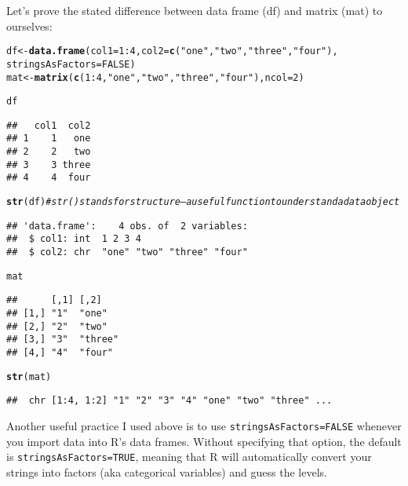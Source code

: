 \documentclass{article}\usepackage[]{graphicx}\usepackage[]{color}
\makeatletter
\newcommand{\hlnum}[1]{\textcolor[rgb]{0.686,0.059,0.569}{#1}}%
\newcommand{\hlstr}[1]{\textcolor[rgb]{0.192,0.494,0.8}{#1}}%
\newcommand{\hlcom}[1]{\textcolor[rgb]{0.678,0.584,0.686}{\textit{#1}}}%
\newcommand{\hlopt}[1]{\textcolor[rgb]{0,0,0}{#1}}%
\newcommand{\hlstd}[1]{\textcolor[rgb]{0.345,0.345,0.345}{#1}}%
\newcommand{\hlkwb}[1]{\textcolor[rgb]{0.69,0.353,0.396}{#1}}%
\newcommand{\hlkwc}[1]{\textcolor[rgb]{0.333,0.667,0.333}{#1}}%
\newcommand{\hlkwd}[1]{\textcolor[rgb]{0.737,0.353,0.396}{\textbf{#1}}}%
\newenvironment{kframe}{%
 \def\at@end@of@kframe{}%
 \ifinner\ifhmode%
  \def\at@end@of@kframe{\end{minipage}}%
  \begin{minipage}{\columnwidth}%
 \fi\fi%
 \def\FrameCommand##1{\hskip\@totalleftmargin \hskip-\fboxsep
 \colorbox{shadecolor}{##1}\hskip-\fboxsep
     \hskip-\linewidth \hskip-\@totalleftmargin \hskip\columnwidth}%
 \MakeFramed {\advance\hsize-\width
   \@totalleftmargin\z@ \linewidth\hsize
   \@setminipage}}%
 {\par\unskip\endMakeFramed%
 \at@end@of@kframe}
\newenvironment{knitrout}{}{} %
\makeatother
\begin{document}
Let's prove the stated difference between data frame (df) and matrix (mat) to ourselves:

\begin{knitrout}
\color{fgcolor}\begin{kframe}
\begin{alltt}
\hlstd{df} \hlkwb{<-} \hlkwd{data.frame}\hlstd{(}\hlkwc{col1} \hlstd{=} \hlnum{1}\hlopt{:}\hlnum{4}\hlstd{,} \hlkwc{col2} \hlstd{=} \hlkwd{c}\hlstd{(}\hlstr{"one"}\hlstd{,} \hlstr{"two"}\hlstd{,} \hlstr{"three"}\hlstd{,} \hlstr{"four"}\hlstd{),}
                 \hlkwc{stringsAsFactors}\hlstd{=}\hlnum{FALSE}\hlstd{)}
\hlstd{mat} \hlkwb{<-} \hlkwd{matrix}\hlstd{(}\hlkwd{c}\hlstd{(}\hlnum{1}\hlopt{:}\hlnum{4}\hlstd{,} \hlstr{"one"}\hlstd{,} \hlstr{"two"}\hlstd{,} \hlstr{"three"}\hlstd{,} \hlstr{"four"}\hlstd{),} \hlkwc{ncol} \hlstd{=} \hlnum{2}\hlstd{)}

\hlstd{df}
\end{alltt}
\begin{verbatim}
##   col1  col2
## 1    1   one
## 2    2   two
## 3    3 three
## 4    4  four
\end{verbatim}
\begin{alltt}
\hlkwd{str}\hlstd{(df)} \hlcom{# str() stands for structure -- a useful function to understand a data object}
\end{alltt}
\begin{verbatim}
## 'data.frame':	4 obs. of  2 variables:
##  $ col1: int  1 2 3 4
##  $ col2: chr  "one" "two" "three" "four"
\end{verbatim}
\begin{alltt}
\hlstd{mat}
\end{alltt}
\begin{verbatim}
##      [,1] [,2]   
## [1,] "1"  "one"  
## [2,] "2"  "two"  
## [3,] "3"  "three"
## [4,] "4"  "four"
\end{verbatim}
\begin{alltt}
\hlkwd{str}\hlstd{(mat)}
\end{alltt}
\begin{verbatim}
##  chr [1:4, 1:2] "1" "2" "3" "4" "one" "two" "three" ...
\end{verbatim}
\end{kframe}
\end{knitrout}

Another useful practice I used above is to use \verb`stringsAsFactors=FALSE` whenever you import data into R's data frames. Without specifying that option, the default is \verb`stringsAsFactors=TRUE`, meaning that R will automatically convert your strings into factors (aka categorical variables) and guess the levels.
\end{document}
